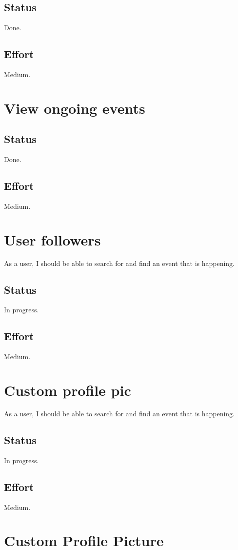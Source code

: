 \documentclass[10pt,a4paper]{article}
\begin{document}
\subsection{Status}
Done.

\subsection{Effort}
Medium.

\section{View ongoing events}
\subsection{Status}
Done.

\subsection{Effort}
Medium.

\section{User followers}
As a user, I should be able to search for and find an event that is happening.
\subsection{Status}
In progress.

\subsection{Effort}
Medium.

\section{Custom profile pic}
As a user, I should be able to search for and find an event that is happening.
\subsection{Status}
In progress.

\subsection{Effort}
Medium.

\section{Custom Profile Picture}
\end{document}
